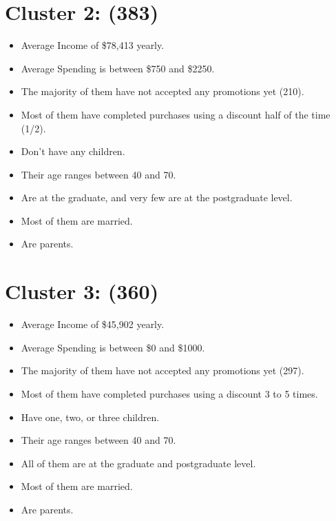 \documentclass[12pt,a4paper]{report}
\begin{document}
\section*{Cluster 2: (383)}
\begin{itemize}
\item Average Income of \$78,413 yearly.
\item Average Spending is between \$750 and \$2250.
\item The majority of them have not accepted any promotions yet (210).
\item Most of them have completed purchases using a discount half of the time (1/2).
\item Don't have any children.
\item Their age ranges between 40 and 70.
\item Are at the graduate, and very few are at the postgraduate level.
\item Most of them are married.
\item Are parents.
\end{itemize}

\section*{Cluster 3: (360)}
\begin{itemize}
\item Average Income of \$45,902 yearly.
\item Average Spending is between \$0 and \$1000.
\item The majority of them have not accepted any promotions yet (297).
\item Most of them have completed purchases using a discount 3 to 5 times.
\item Have one, two, or three children.
\item Their age ranges between 40 and 70.
\item All of them are at the graduate and postgraduate level.
\item Most of them are married.
\item Are parents.
\end{itemize}
\end{document}
